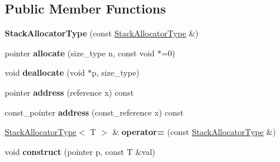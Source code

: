 \subsection*{Public Member Functions}
\begin{DoxyCompactItemize}
\item 
\mbox{\label{classCantMemory_1_1StackAllocatorType_acfa1ebde08341b6b3c29a171d701dde3}} 
{\bfseries Stack\+Allocator\+Type} (const \hyperlink{classCantMemory_1_1StackAllocatorType}{Stack\+Allocator\+Type} \&)
\item 
\mbox{\label{classCantMemory_1_1StackAllocatorType_a17486ddbaa46c91be5967e64f07461fc}} 
pointer {\bfseries allocate} (size\+\_\+type n, const void $\ast$=0)
\item 
\mbox{\label{classCantMemory_1_1StackAllocatorType_a0db5e96fca3ad74da7789e7d176e91c7}} 
void {\bfseries deallocate} (void $\ast$p, size\+\_\+type)
\item 
\mbox{\label{classCantMemory_1_1StackAllocatorType_af024d0524e469c3d9d69ee41228e90eb}} 
pointer {\bfseries address} (reference x) const
\item 
\mbox{\label{classCantMemory_1_1StackAllocatorType_a043903a47980f04524e0fa1c60ebd445}} 
const\+\_\+pointer {\bfseries address} (const\+\_\+reference x) const
\item 
\mbox{\label{classCantMemory_1_1StackAllocatorType_a90d80d26a3b10320e6600ce86ceb9e56}} 
\hyperlink{classCantMemory_1_1StackAllocatorType}{Stack\+Allocator\+Type}$<$ T $>$ \& {\bfseries operator=} (const \hyperlink{classCantMemory_1_1StackAllocatorType}{Stack\+Allocator\+Type} \&)
\item 
\mbox{\label{classCantMemory_1_1StackAllocatorType_a14b25658d08b2e7fa3b9ceeb1c30fc0e}} 
void {\bfseries construct} (pointer p, const T \&val)
\item 
\mbox{\label{classCantMemory_1_1StackAllocatorType_ac6d54a1c7fa387534942dc35c03533bb}} 

\end{DoxyCompactItemize}
